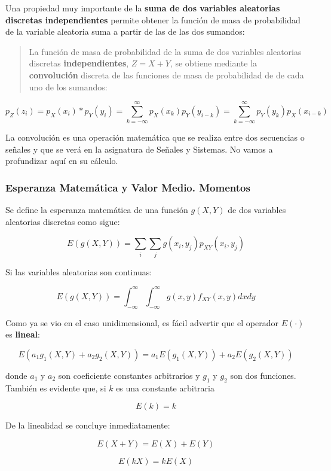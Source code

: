 \documentclass[11pt]{article}
\begin{document}
    Una propiedad muy importante de la \textbf{suma de dos variables
aleatorias discretas independientes} permite obtener la función de masa
de probabilidad de la variable aleatoria suma a partir de las de las dos
sumandos:

\begin{quote}
La función de masa de probabilidad de la suma de dos variables
aleatorias discretas \textbf{independientes}, \(Z = X+Y\), se obtiene
mediante la \textbf{convolución} discreta de las funciones de masa de
probabilidad de de cada uno de los sumandos:
\end{quote}

\[p_Z(z_i)= p_X(x_i)*p_Y(y_i)=\sum_{k=-\infty}^\infty p_X(x_k)p_Y(y_{i-k})=\sum_{k=-\infty}^\infty p_Y(y_k)p_X(x_{i-k}) \]

La convolución es una operación matemática que se realiza entre dos
secuencias o señales y que se verá en la asignatura de Señales y
Sistemas. No vamos a profundizar aquí en su cálculo.

    \hypertarget{esperanza-matemuxe1tica-y-valor-medio.-momentos}{%
\subsubsection{Esperanza Matemática y Valor Medio.
Momentos}\label{esperanza-matemuxe1tica-y-valor-medio.-momentos}}

Se define la esperanza matemática de una función \(g(X, Y)\) de dos
variables aleatorias discretas como sigue:

\[E\left(g(X, Y)\right)=\sum_i\sum_j g(x_i,y_j)p_{XY}(x_i,y_j)\]

Si las variables aleatorias son continuas:

\[E\left(g(X, Y)\right)=\int_{-\infty}^\infty\int_{-\infty}^\infty g(x,y)f_{XY}(x,y)dxdy\]

    Como ya se vio en el caso unidimensional, es fácil advertir que el
operador \(E(·)\) es \textbf{lineal}:

\[E(a_1g_1(X,Y)+a_2g_2(X,Y))=a_1E(g_1(X,Y)) + a_2E(g_2(X,Y))\]

donde \(a_1\) y \(a_2\) son coeficiente constantes arbitrarios y \(g_1\)
y \(g_2\) son dos funciones. También es evidente que, si \(k\) es una
constante arbitraria

\[E(k) = k\]

De la linealidad se concluye inmediatamente:

\[E(X+Y) = E(X) + E(Y)\]

\[E(kX) = kE(X)\]
\end{document}
